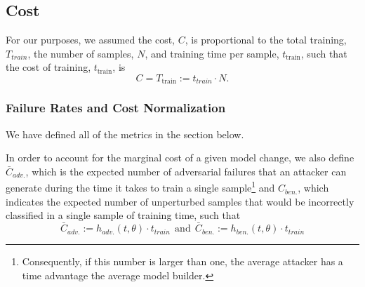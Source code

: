 \subsection{Cost}\label{cost}

For our purposes, we assumed the cost, $C$, is proportional to the total training, $T_{train}$, the number of samples, $N$, and training time per sample, $t_{\mathrm{train}}$, such that the cost of training, $t_{\mathrm{train}}$, is
\[
    C = T_{\mathrm{train}} := t_{train} \cdot N.
\]




\subsubsection{Failure Rates and Cost Normalization}
We have defined all of the metrics in the section below.
\label{metrics}

In order to account for the marginal cost of a given model change, we also define $\bar{C}_{adv.}$, which is the expected number of adversarial failures that an attacker can generate during the time it takes to train a single sample\footnote{Consequently, if this number is larger than one, the average attacker has a time advantage the average model builder.} and $C_{ben.}$, which indicates the expected number of unperturbed samples that would be incorrectly classified in a single sample of training time, such that
\begin{equation}
    \bar{C}_{adv.} := h_{adv.}(t, \theta) \cdot t_{train}
     ~~\textrm{and}~~
     \bar{C}_{ben.} := h_{ben.}(t, \theta) \cdot t_{train}
\label{eq:cost}
\end{equation}







